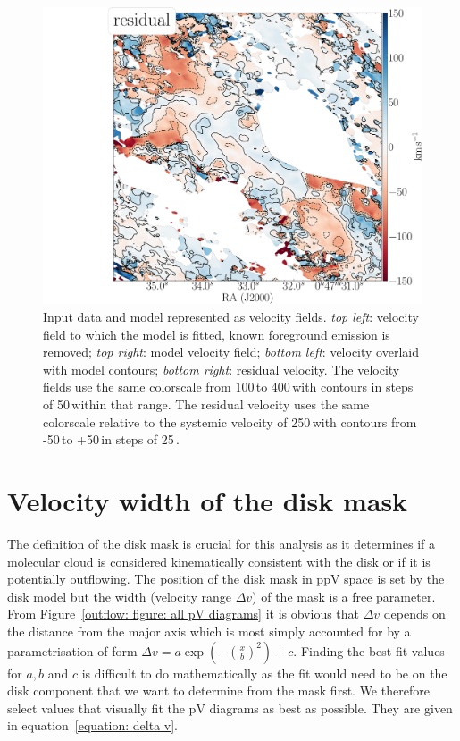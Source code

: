 \begin{figure}
	\includegraphics[scale=0.18]{images/chapters/papers/outflow/outflow_figA1d.pdf}
	\caption[Observed and modeled velocity field]{Input data and model represented as velocity fields. \emph{top left}:  velocity field to which the model is fitted, known foreground emission is removed; \emph{top right}: model velocity field; \emph{bottom left}:  velocity overlaid with model contours; \emph{bottom right}: residual velocity. The velocity fields use the same colorscale from 100\,\kms to 400\,\kms with contours in steps of 50\,\kms within that range. The residual velocity uses the same colorscale relative to the systemic velocity of 250\,\kms with contours from -50\,\kms to +50\,\kms in steps of 25\,\kms.}
	\label{outflow: figure: model}
\end{figure}



\section{Velocity width of the disk mask}
\label{appendix: outflow: disk velocity range}

The definition of the disk mask is crucial for this analysis as it determines if a molecular cloud is considered kinematically consistent with the disk or if it is potentially outflowing. The position of the disk mask in ppV space is set by the disk model but the width (velocity range $\Delta v$) of the mask is a free parameter. From Figure~\ref{outflow: figure: all pV diagrams} it is obvious that $\Delta v$ depends on the distance from the major axis which is most simply accounted for by a parametrisation of form $\Delta v = a \exp \left( -\left( \frac{x}{b} \right)^2 \right) +c$. Finding the best fit values for $a, b$ and $c$ is difficult to do mathematically as the fit would need to be on the disk component that we want to determine from the mask first. We therefore select values that visually fit the pV diagrams as best as possible. They are given in equation~\ref{equation: delta v}.


